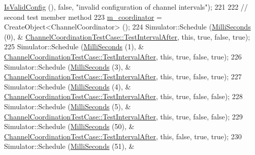 \begin{DoxyCode}
      \hyperlink{classns3_1_1ChannelCoordinator_a095c5690097ab3b081b53e026bacffdd}{IsValidConfig} (), \textcolor{keyword}{false}, \textcolor{stringliteral}{"invalid configuration of channel intervals"});
221 
222   \textcolor{comment}{// second test member method}
223   \hyperlink{classChannelCoordinationTestCase_aa469b580039ced8be2fdd10720594cf2}{m\_coordinator} = CreateObject<ChannelCoordinator> ();
224   Simulator::Schedule (\hyperlink{group__timecivil_gaf26127cf4571146b83a92ee18679c7a9}{MilliSeconds} (0), &
      \hyperlink{classChannelCoordinationTestCase_a5a6891984b8599dbffd80e80b6faf92a}{ChannelCoordinationTestCase::TestIntervalAfter}, \textcolor{keyword}{this}, \textcolor{keyword}{true}, \textcolor{keyword}{
      false}, \textcolor{keyword}{true});
225   Simulator::Schedule (\hyperlink{group__timecivil_gaf26127cf4571146b83a92ee18679c7a9}{MilliSeconds} (1), &
      \hyperlink{classChannelCoordinationTestCase_a5a6891984b8599dbffd80e80b6faf92a}{ChannelCoordinationTestCase::TestIntervalAfter}, \textcolor{keyword}{this}, \textcolor{keyword}{true}, \textcolor{keyword}{
      false}, \textcolor{keyword}{true});
226   Simulator::Schedule (\hyperlink{group__timecivil_gaf26127cf4571146b83a92ee18679c7a9}{MilliSeconds} (3), &
      \hyperlink{classChannelCoordinationTestCase_a5a6891984b8599dbffd80e80b6faf92a}{ChannelCoordinationTestCase::TestIntervalAfter}, \textcolor{keyword}{this}, \textcolor{keyword}{true}, \textcolor{keyword}{
      false}, \textcolor{keyword}{true});
227   Simulator::Schedule (\hyperlink{group__timecivil_gaf26127cf4571146b83a92ee18679c7a9}{MilliSeconds} (4), &
      \hyperlink{classChannelCoordinationTestCase_a5a6891984b8599dbffd80e80b6faf92a}{ChannelCoordinationTestCase::TestIntervalAfter}, \textcolor{keyword}{this}, \textcolor{keyword}{true}, \textcolor{keyword}{
      false}, \textcolor{keyword}{false});
228   Simulator::Schedule (\hyperlink{group__timecivil_gaf26127cf4571146b83a92ee18679c7a9}{MilliSeconds} (5), &
      \hyperlink{classChannelCoordinationTestCase_a5a6891984b8599dbffd80e80b6faf92a}{ChannelCoordinationTestCase::TestIntervalAfter}, \textcolor{keyword}{this}, \textcolor{keyword}{true}, \textcolor{keyword}{
      false}, \textcolor{keyword}{false});
229   Simulator::Schedule (\hyperlink{group__timecivil_gaf26127cf4571146b83a92ee18679c7a9}{MilliSeconds} (50), &
      \hyperlink{classChannelCoordinationTestCase_a5a6891984b8599dbffd80e80b6faf92a}{ChannelCoordinationTestCase::TestIntervalAfter}, \textcolor{keyword}{this}, \textcolor{keyword}{false}, \textcolor{keyword}{
      true}, \textcolor{keyword}{true});
230   Simulator::Schedule (\hyperlink{group__timecivil_gaf26127cf4571146b83a92ee18679c7a9}{MilliSeconds} (51), &

\end{DoxyCode}
